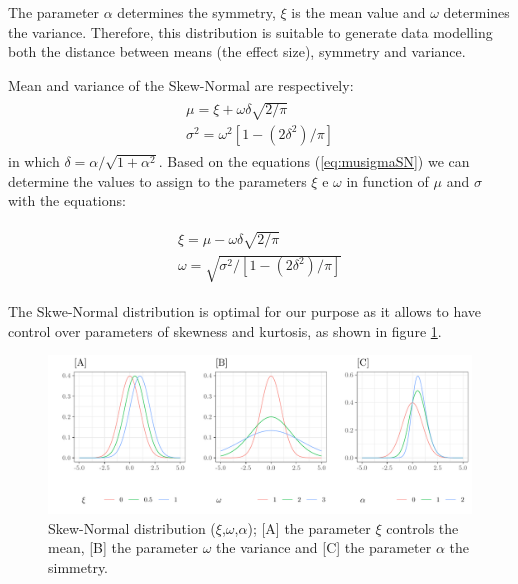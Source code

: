 \documentclass[10pt]{article}\usepackage[]{graphicx}\usepackage[]{xcolor}
\makeatletter
\def\maxwidth{ %
  \ifdim\Gin@nat@width>\linewidth
    \linewidth
  \else
    \Gin@nat@width
  \fi
}
\newenvironment{knitrout}{}{} %
\makeatother
\begin{document}
The parameter $\alpha$ determines the symmetry, $\xi$ is the mean value and $\omega$ determines the variance. Therefore, this distribution is suitable to generate data modelling both the distance between means (the effect size), symmetry and variance.

Mean and variance of the Skew-Normal are respectively: 
\begin{eqnarray}\label{eq:musigmaSN}
\begin{array}{l}
\mu = \xi + \omega \delta \sqrt{2/\pi} \\
\sigma^2 = \omega^2 [1- (2\delta^2)/\pi]
\end{array}
\end{eqnarray}
in which $\delta = \alpha / \sqrt{1 + \alpha^2}$. Based on the equations (\ref{eq:musigmaSN}) we can determine the values to assign to the parameters $\xi$ e $\omega$ in function of $\mu$ and $\sigma$ with the equations:

\begin{eqnarray}\label{eq:xiomegaSN}
\begin{array}{l}
 \xi = \mu - \omega \delta \sqrt{2/\pi} \\
 \omega = \sqrt{\sigma^2/ [1- (2\delta^2)/\pi]}
\end{array}
\end{eqnarray}

The Skwe-Normal distribution is optimal for our purpose as it allows to have control over parameters of skewness and kurtosis, as shown in figure \ref{fig:scenari}.

\begin{knitrout}
\color{fgcolor}\begin{figure}

{\centering \includegraphics[width=\maxwidth]{figure/scenari-1} 

}

\caption[Skew-Normal distribution ($\xi$,$\omega$,$\alpha$)]{Skew-Normal distribution ($\xi$,$\omega$,$\alpha$); [A] the parameter $\xi$ controls the mean, [B] the parameter $\omega$ the variance and [C] the parameter  $\alpha$ the simmetry.}\label{fig:scenari}
\end{figure}

\end{knitrout}
\end{document}
